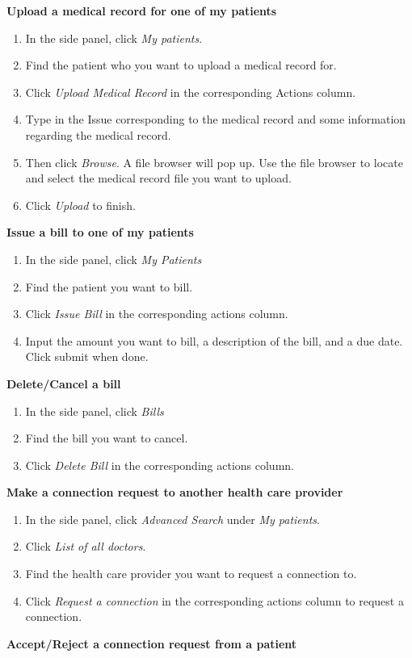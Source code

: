 \documentclass[12pt]{report}
\begin{document}
\textbf{Upload a medical record for one of my patients}
\begin{enumerate}
\item In the side panel, click \textit{My patients}.
\item Find the patient who you want to upload a medical record for.
\item Click \textit{Upload Medical Record} in the corresponding Actions column.
\item Type in the Issue corresponding to the medical record and some information regarding the medical record.
\item Then click \textit{Browse}. A file browser will pop up. Use the file browser to locate and select the medical record file you want to upload.
\item Click \textit{Upload} to finish.
\end{enumerate}
\textbf{Issue a bill to one of my patients}
\begin{enumerate}
\item In the side panel, click \textit{My Patients}
\item Find the patient you want to bill. 
\item Click \textit{Issue Bill} in the corresponding actions column.
\item Input the amount you want to bill, a description of the bill, and a due date. Click submit when done.
\end{enumerate}
\textbf{Delete/Cancel a bill}
\begin{enumerate}
\item In the side panel, click \textit{Bills}
\item Find the bill you want to cancel.
\item Click \textit{Delete Bill} in the corresponding actions column.
\end{enumerate}
\textbf{Make a connection request to another health care provider}
\begin{enumerate}
\item In the side panel, click \textit{Advanced Search} under \textit{My patients}.
\item Click \textit{List of all doctors}.
\item Find the health care provider you want to request a connection to.
\item Click \textit{Request a connection} in the corresponding actions column to request a connection.
\end{enumerate}
\textbf{Accept/Reject a connection request from a patient}
\end{document}

